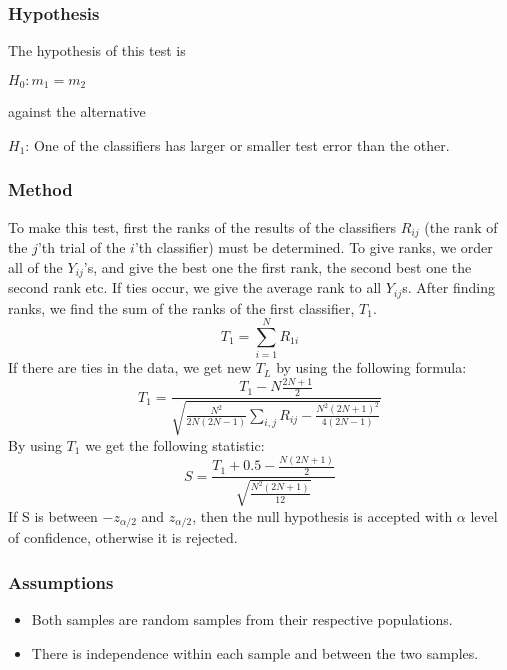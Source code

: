 \documentclass[a4paper,12pt]{book}
\begin{document}
\subsubsection{Hypothesis}
The hypothesis of this test is   
\begin{center}
$H_0: m_1=m_2$
\end{center}
against the alternative
\begin{center}
$H_1$: One of the classifiers has larger or smaller test error than the other.
\end{center}

\subsubsection{Method}
To make this test, first the ranks of the results of the classifiers $R_{ij}$ (the rank of the $j$'th trial of
the $i$'th classifier) must be determined. To give ranks, we order all of the $Y_{ij}$'s, and give the best one the first rank, the second best one the second rank etc. If ties occur, we give the average rank to all $Y_{ij}$s. After finding ranks, we find the sum of the ranks of the first classifier, $T_1$.
\begin{equation}
T_1=\sum_{i=1}^NR_{1i}
\end{equation}
If there are ties in the data, we get new $T_L$ by using the following formula:
\begin{equation}
T_1=\frac{T_1-N\frac{2N+1}{2}}{\sqrt{\frac{N^2}{2N(2N-1)}\sum_{i, j}R_{ij}-\frac{N^2(2N+1)^2}{4(2N-1)}}}
\end{equation}
By using $T_1$ we get the following statistic:
\begin{equation}
S=\frac{T_1+0.5-\frac{N(2N+1)}{2}}{\sqrt{\frac{N^2(2N+1)}{12}}}
\end{equation}
If S is between $-z_{\alpha / 2}$ and $z_{\alpha / 2}$, then the null hypothesis is accepted with $\alpha$ level of confidence, otherwise it is rejected.

\subsubsection{Assumptions}
\begin{itemize}
\item Both samples are random samples from their respective populations.
\item There is independence within each sample and between the two samples.
\end{itemize}
\end{document}
